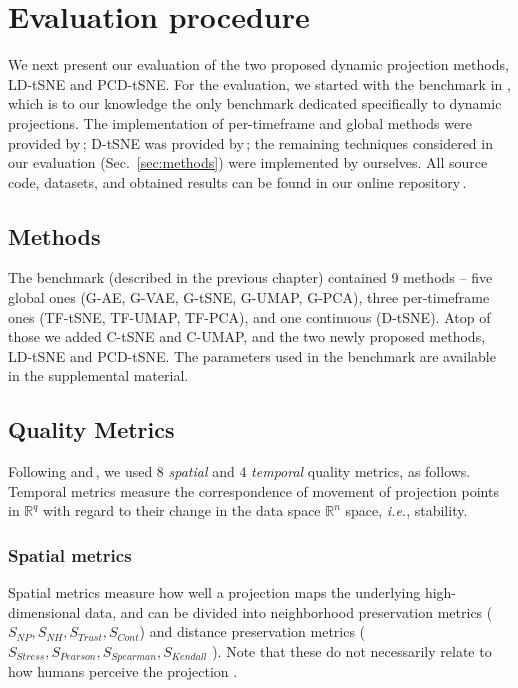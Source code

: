 \section{Evaluation procedure} 
\label{sec:experimental-setup}
%
We next present our evaluation of the two proposed dynamic projection methods, LD-tSNE and PCD-tSNE. For the evaluation, we started with the benchmark in \cite{Vernier2020}, which is to our knowledge the only benchmark dedicated specifically to dynamic projections. The implementation of per-timeframe and global methods were provided by\,\cite{Vernier2020}; D-tSNE was provided by\,\cite{Rauber2016};  the remaining techniques considered in our evaluation (Sec.~\ref{sec:methods}) were implemented by ourselves. All source code, datasets, and obtained results can be found in our online repository\,\citep{repo-guided}. 

\subsection{Methods}
\label{sec:eval-methods}

The \cite{Vernier2020} benchmark (described in the previous chapter) contained 9 methods -- five global ones (G-AE, G-VAE, G-tSNE, G-UMAP, G-PCA), three per-timeframe ones (TF-tSNE, TF-UMAP, TF-PCA), and one continuous (D-tSNE).  Atop of those we added C-tSNE and C-UMAP, and the two newly proposed methods, LD-tSNE and PCD-tSNE. The parameters used in the benchmark are available in the supplemental material.

\subsection{Quality Metrics}
\label{sec:metrics}
%
Following \cite{Vernier2020} and\,\cite{Espadoto19}, we used 8 \emph{spatial} and 4 \emph{temporal} quality metrics, as follows. Temporal metrics measure the correspondence of movement of projection points in $\mathbb{R}^q$ with regard to their change in the data space $\mathbb{R}^n$ space, \emph{i.e.}, stability. 

\subsubsection{Spatial metrics}
\label{sec:spatial}

Spatial metrics measure how well a projection maps the underlying high-dimensional data, and can be divided into neighborhood preservation metrics ($S_{NP}, S_{NH}, S_{Trust}, S_{Cont}$) and distance preservation metrics ($S_{Stress}, S_{Pearson}, S_{Spearman}, S_{Kendall}$ ). Note that these do not necessarily relate to how humans perceive the projection \citep{Wang2018}.\\

